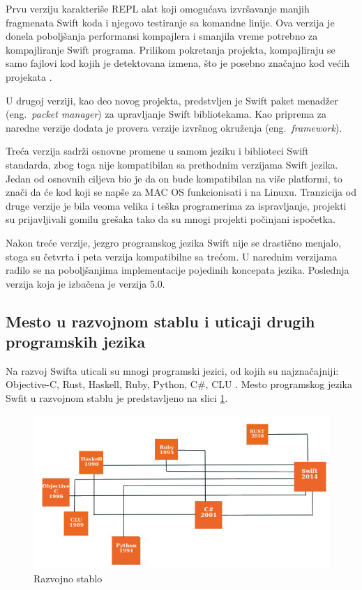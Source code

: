 \documentclass[a4paper]{article}
\begin{document}
Prvu verziju karakteriše REPL alat koji omogućava izvršavanje  manjih fragmenata Swift koda i njegovo testiranje sa komandne linije. Ova verzija je donela poboljšanja performansi kompajlera i smanjila vreme potrebno za kompajliranje Swift programa. Prilikom pokretanja projekta, kompajliraju se samo fajlovi kod kojih je detektovana izmena, što je posebno značajno kod većih projekata \cite{swiftdev_sajt}. 

U drugoj verziji, kao deo novog projekta, predstvljen je Swift paket menadžer (eng.~{\em packet manager}) za upravljanje Swift bibliotekama. Kao priprema za naredne verzije dodata je provera verzije izvršnog okruženja (eng.~{\em framework}). 

Treća verzija sadrži osnovne promene u samom jeziku i biblioteci Swift standarda, zbog toga nije kompatibilan sa prethodnim verzijama Swift jezika. Jedan od osnovnih ciljeva bio je da on bude kompatibilan na više platformi, to znači da će kod koji se napše za MAC OS funkcionisati i na Linuxu. Tranzicija od druge verzije je bila veoma velika i teška programerima za ispravljanje, projekti su prijavljivali gomilu grešaka tako da su mnogi projekti počinjani ispočetka. 

Nakon treće verzije, jezgro programskog jezika Swift nije se drastično menjalo, stoga su četvrta i peta verzija kompatibilne sa trećom. U narednim verzijama radilo se na poboljšanjima implementacije pojedinih koncepata jezika. Poslednja verzija koja je izbačena je verzija 5.0.
  
\subsection{Mesto u razvojnom stablu i uticaji drugih programskih jezika}
\label{subsec:podnaslov6}
Na razvoj Swifta uticali su mnogi programski jezici, od kojih su najznačajniji: Objective-C, Rust, Haskell, Ruby, Python, C\#, CLU \cite{chris_sajt}. Mesto programskog jezika Swfit u razvojnom stablu je predstavljeno na slici \ref{fig:razvojno_stablo}.

\begin{figure}[h!]
\begin{center}
\includegraphics[scale=0.5]{razvojno_stablo.jpg}
\end{center}
\caption{Razvojno stablo}
\label{fig:razvojno_stablo}
\end{figure}
\end{document}
